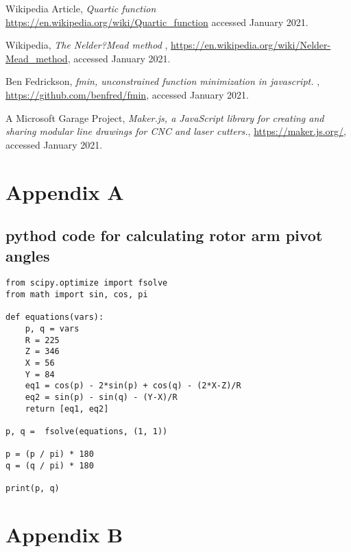 \documentclass[11pt]{article}
\begin{document}
\begin{thebibliography}{99}


 Wikipedia Article,
{\em Quartic function} 
\url{https://en.wikipedia.org/wiki/Quartic_function}
accessed January 2021.

 Wikipedia,
{\em The Nelder?Mead method },
\url{https://en.wikipedia.org/wiki/Nelder-Mead_method},
accessed January 2021.

 Ben Fedrickson,
{\em fmin, unconstrained function minimization in javascript.  },
\url{https://github.com/benfred/fmin},
accessed January 2021.

 A Microsoft Garage Project,
{\em Maker.js, a JavaScript library for creating and sharing modular line drawings for CNC and laser cutters.},
\url{https://maker.js.org/},
accessed January 2021.

\end{thebibliography}

\section*{Appendix A}
\subsection*{pythod code for calculating rotor arm pivot angles}

\tiny
\begin{lstlisting}
from scipy.optimize import fsolve
from math import sin, cos, pi

def equations(vars):
    p, q = vars
    R = 225
    Z = 346
    X = 56
    Y = 84
    eq1 = cos(p) - 2*sin(p) + cos(q) - (2*X-Z)/R
    eq2 = sin(p) - sin(q) - (Y-X)/R
    return [eq1, eq2]

p, q =  fsolve(equations, (1, 1))

p = (p / pi) * 180
q = (q / pi) * 180

print(p, q)
\end{lstlisting}


\normalsize
\newpage
\section*{Appendix B}
\end{document}
